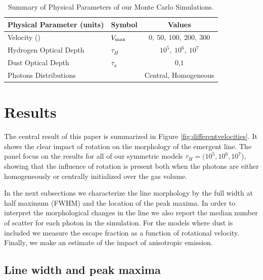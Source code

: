 \documentclass{emulateapj}
\newcommand{\ly}{{\ifmmode{{\rm Ly}\alpha~}\else{Ly$\alpha$~}\fi}}
\newcommand{\kms}{{\ifmmode{{\mathrm{\,km\ s}^{-1}}}\else{\,km~s$^{-1}$}\fi}}
\begin{document}
\begin{table}
\begin{center}
\begin{tabular}{llc}\hline\hline
Physical Parameter (units) & Symbol & Values\\\hline
Velocity (\kms) & $V_{\rm max}$&$0,\ 50,\ 100,\ 200,\ 300$\\
Hydrogen Optical Depth & $\tau_{H} $ & $10^{5},\ 10^{6},\ 10^{7}$\\
Dust Optical Depth & $\tau_{a}$ & $0$,$1$\\
Photons Distributions & & Central, Homogeneous\\\hline\hline
\end{tabular}
\caption{
  Summary of Physical Parameters of our Monte Carlo Simulations.} 
\label{table:models}
\end{center}
\end{table}


\section{Results}
\label{sec:results}

The central result of this paper is summarized in Figure
\ref{fig:differentvelocities}. It shows the clear
impact of rotation on the morphology of the emergent \ly line.
The panel focus on the results for all of our symmetric models
 $\tau_{H}=(10^{5}, 10^{6}, 10^{7}$), showing that the
influence of rotation is present both when the photons are either
homogeneously or centrally initialized over the gas volume.  

In the next subsections we characterize the line morphology by the
full width at half maximum (FWHM) and the location of the peak
maxima. In order to interpret the morphological changes in the line we
also report the median number of scatter for each \ly photon in the
simulation. For the models where dust is included we measure the 
escape fraction as a function of rotational velocity. Finally, we make
an estimate of the impact of anisotropic emission.



\subsection{Line width and peak maxima}
\label{sec:widthpeak}
\end{document}
